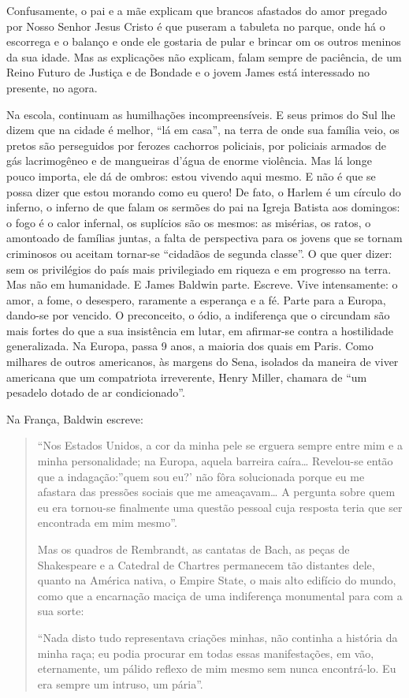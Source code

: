 \documentclass[
  letterpaper,
  DIV=11,
  numbers=noendperiod]{scrreprt}
\begin{document}
Confusamente, o pai e a mãe explicam que brancos afastados do amor
pregado por Nosso Senhor Jesus Cristo é que puseram a tabuleta no
parque, onde há o escorrega e o balanço e onde ele gostaria de pular e
brincar om os outros meninos da sua idade. Mas as explicações não
explicam, falam sempre de paciência, de um Reino Futuro de Justiça e de
Bondade e o jovem James está interessado no presente, no agora.

Na escola, continuam as humilhações incompreensíveis. E seus primos do
Sul lhe dizem que na cidade é melhor, ``lá em casa'', na terra de onde
sua família veio, os pretos são perseguidos por ferozes cachorros
policiais, por policiais armados de gás lacrimogêneo e de mangueiras
d'água de enorme violência. Mas lá longe pouco importa, ele dá de
ombros: estou vivendo aqui mesmo. E não é que se possa dizer que estou
morando como eu quero! De fato, o Harlem é um círculo do inferno, o
inferno de que falam os sermões do pai na Igreja Batista aos domingos: o
fogo é o calor infernal, os suplícios são os mesmos: as misérias, os
ratos, o amontoado de famílias juntas, a falta de perspectiva para os
jovens que se tornam criminosos ou aceitam tornar-se ``cidadãos de
segunda classe''. O que quer dizer: sem os privilégios do país mais
privilegiado em riqueza e em progresso na terra. Mas não em humanidade.
E James Baldwin parte. Escreve. Vive intensamente: o amor, a fome, o
desespero, raramente a esperança e a fé. Parte para a Europa, dando-se
por vencido. O preconceito, o ódio, a indiferença que o circundam são
mais fortes do que a sua insistência em lutar, em afirmar-se contra a
hostilidade generalizada. Na Europa, passa 9 anos, a maioria dos quais
em Paris. Como milhares de outros americanos, às margens do Sena,
isolados da maneira de viver americana que um compatriota irreverente,
Henry Miller, chamara de ``um pesadelo dotado de ar condicionado''.

Na França, Baldwin escreve:

\begin{quote}
``Nos Estados Unidos, a cor da minha pele se erguera sempre entre mim e
a minha personalidade; na Europa, aquela barreira caíra\ldots{}
Revelou-se então que a indagação:''quem sou eu?' não fôra solucionada
porque eu me afastara das pressões sociais que me ameaçavam\ldots{} A
pergunta sobre quem eu era tornou-se finalmente uma questão pessoal cuja
resposta teria que ser encontrada em mim mesmo''.

Mas os quadros de Rembrandt, as cantatas de Bach, as peças de
Shakespeare e a Catedral de Chartres permanecem tão distantes dele,
quanto na América nativa, o Empire State, o mais alto edifício do mundo,
como que a encarnação maciça de uma indiferença monumental para com a
sua sorte:

``Nada disto tudo representava criações minhas, não continha a história
da minha raça; eu podia procurar em todas essas manifestações, em vão,
eternamente, um pálido reflexo de mim mesmo sem nunca encontrá-lo. Eu
era sempre um intruso, um pária''.
\end{quote}
\end{document}
